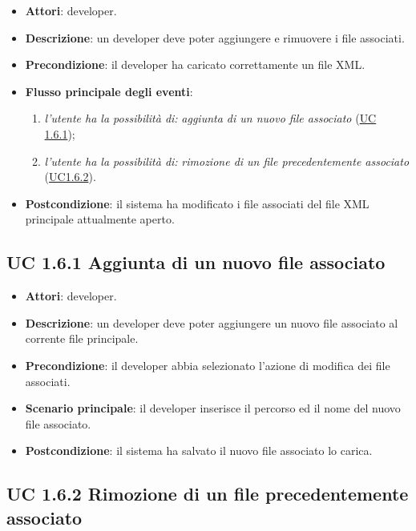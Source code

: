 		\begin{itemize}
			\item\textbf{Attori}: developer.
			\item\textbf{Descrizione}: un developer deve poter aggiungere e rimuovere i file associati.
			\item\textbf{Precondizione}: il developer ha caricato correttamente un file XML.
			\item\textbf{Flusso principale degli eventi}: 
			\begin{enumerate}
				\item \textit{l'utente ha la possibilità di:} \textit{aggiunta di un nuovo file associato} (\hyperref[subsec:XEUC1.6.1]{UC 1.6.1});
				
				\item \textit{l'utente ha la possibilità di:} \textit{rimozione di un file precedentemente associato} (\hyperref[subsec:XEUC1.6.2]{UC1.6.2}).
				
			\end{enumerate}
			\item\textbf{Postcondizione}: il sistema ha modificato i file associati del file XML principale attualmente aperto.
		\end{itemize}
		
	\subsection{UC 1.6.1 Aggiunta di un nuovo file associato}
		\label{subsec:XEUC1.6.1}
		
		\begin{itemize}
			\item\textbf{Attori}: developer.
			\item\textbf{Descrizione}: un developer deve poter aggiungere un nuovo file associato al corrente file principale.
			\item\textbf{Precondizione}: il developer abbia selezionato l'azione di modifica dei file associati.
			\item\textbf{Scenario principale}: il developer inserisce il percorso ed il nome del nuovo file associato.
			\item\textbf{Postcondizione}: il sistema ha salvato il nuovo file associato lo carica.
		\end{itemize}
		
	\subsection{UC 1.6.2 Rimozione di un file precedentemente associato}
		\label{subsec:XEUC1.6.2}
		

